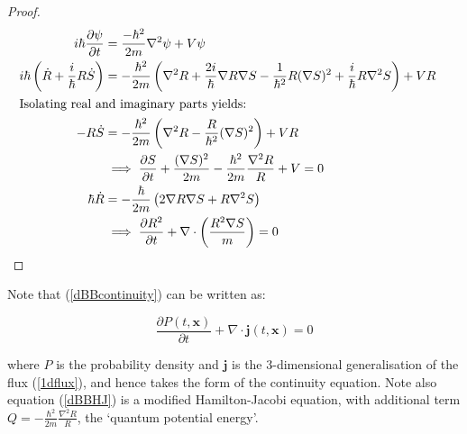 \documentclass{article}
\begin{document}
\begin{proof}
\begin{subequations}
\begin{flalign}
i\hbar \frac{\partial\psi}{\partial t} &= \frac{-\hbar^2}{2m}\nabla^2\psi+V\psi&\\
i\hbar\left(\dot{R}+\frac{i}{\hbar}R\dot{S}\right) &= -\frac{\hbar^2}{2m}\left(\nabla^2R+\frac{2i}{\hbar}\nabla R \nabla S-\frac{1}{\hbar^2}R(\nabla S)^2+\frac{i}{\hbar}R\nabla^2 S\right)+VR\\\intertext{Isolating real and imaginary parts yields:}
-R\dot{S}&=-\frac{\hbar^2}{2m}\left(\nabla^2 R-\frac{R}{\hbar^2}(\nabla S)^2\right)+VR&\\
	 &\implies \frac{\partial S}{\partial t}+\frac{(\nabla S)^2}{2m}-\frac{\hbar^2}{2m}\frac{\nabla^2 R}{R}+V=0\\
\hbar\dot{R} &= -\frac{\hbar}{2m}\left(2\nabla R\nabla S+R\nabla^2S\right)\\
	     &\implies \frac{\partial R^2}{\partial t}+\nabla\cdot\left(\frac{R^2\nabla S}{m}\right)=0
\end{flalign}
\end{subequations}
\end{proof}

\noindent Note that (\ref{dBBcontinuity}) can be written as:

\begin{equation}
	\frac{\partial P(t,\boldsymbol{x})}{\partial t}+\nabla \cdot \boldsymbol{j}(t,\boldsymbol{x})=0
\end{equation}

\noindent where $P$ is the probability density and $\boldsymbol{j}$ is the 3-dimensional generalisation of the flux (\ref{1dflux}), and hence takes the form of the continuity equation. Note also equation (\ref{dBBHJ}) is a modified Hamilton-Jacobi equation, with additional term $Q=-\frac{\hbar^2}{2m}\frac{\nabla^2 R}{R}$, the `quantum potential energy'.
\end{document}
